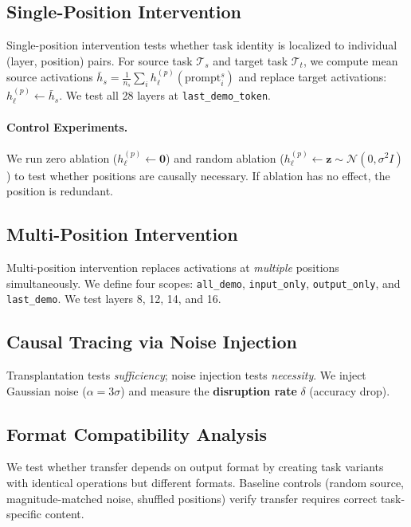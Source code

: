 \documentclass{article}
\begin{document}
\subsection{Single-Position Intervention}

Single-position intervention tests whether task identity is localized to individual (layer, position) pairs. For source task $\mathcal{T}_s$ and target task $\mathcal{T}_t$, we compute mean source activations $\bar{h}_s = \frac{1}{n_s}\sum_i h_\ell^{(p)}(\text{prompt}_i^s)$ and replace target activations: $h_\ell^{(p)} \leftarrow \bar{h}_s$. We test all 28 layers at \texttt{last\_demo\_token}.

\paragraph{Control Experiments.} We run zero ablation ($h_\ell^{(p)} \leftarrow \mathbf{0}$) and random ablation ($h_\ell^{(p)} \leftarrow \mathbf{z} \sim \mathcal{N}(0, \sigma^2 I)$) to test whether positions are causally necessary. If ablation has no effect, the position is redundant.

\subsection{Multi-Position Intervention}

Multi-position intervention replaces activations at \emph{multiple} positions simultaneously. We define four scopes: \texttt{all\_demo}, \texttt{input\_only}, \texttt{output\_only}, and \texttt{last\_demo}. We test layers 8, 12, 14, and 16.

\subsection{Causal Tracing via Noise Injection}

Transplantation tests \emph{sufficiency}; noise injection tests \emph{necessity}. We inject Gaussian noise ($\alpha = 3\sigma$) and measure the \textbf{disruption rate} $\delta$ (accuracy drop).

\subsection{Format Compatibility Analysis}

We test whether transfer depends on output format by creating task variants with identical operations but different formats. Baseline controls (random source, magnitude-matched noise, shuffled positions) verify transfer requires correct task-specific content.
\end{document}
